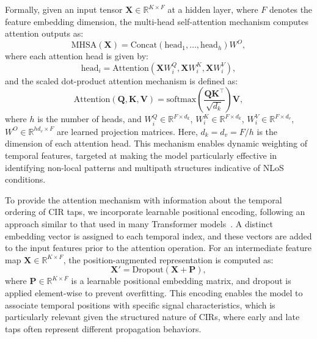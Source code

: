Formally, given an input tensor $\mathbf{X} \in \mathbb{R}^{K \times F}$ at a hidden layer, where $F$ denotes the feature embedding dimension, the multi-head self-attention mechanism computes attention outputs as:
\begin{equation}
    \text{MHSA}(\mathbf{X}) = \text{Concat}(\text{head}_1, \dots, \text{head}_h) W^O,
\end{equation}
where each attention head is given by:
\begin{equation}
    \text{head}_i = \text{Attention}(\mathbf{X} W_i^Q, \mathbf{X} W_i^K, \mathbf{X} W_i^V),
\end{equation}
and the scaled dot-product attention mechanism is defined as:
\begin{equation}
    \text{Attention}(\mathbf{Q}, \mathbf{K}, \mathbf{V}) = \text{softmax}\left( \frac{\mathbf{Q} \mathbf{K}^\top}{\sqrt{d_k}} \right) \mathbf{V},
\end{equation}
where $h$ is the number of heads, and $W_i^Q \in \mathbb{R}^{F \times d_k}$, $W_i^K \in \mathbb{R}^{F \times d_k}$, $W_i^V \in \mathbb{R}^{F \times d_v}$, $W^O \in \mathbb{R}^{hd_v \times F}$ are learned projection matrices. Here, $d_k = d_v = F/h$ is the dimension of each attention head. This mechanism enables dynamic weighting of temporal features, targeted at making the model particularly effective in identifying non-local patterns and multipath structures indicative of NLoS conditions.

To provide the attention mechanism with information about the temporal ordering of CIR taps, we incorporate learnable positional encoding, following an approach similar to that used in many Transformer models~\cite{2019-bert, 2022-simple-yet}. A distinct embedding vector is assigned to each temporal index, and these vectors are added to the input features prior to the attention operation. For an intermediate feature map $\mathbf{X} \in \mathbb{R}^{K \times F}$, the position-augmented representation is computed as:
\begin{equation}
    \mathbf{X}' = \text{Dropout}(\mathbf{X} + \mathbf{P}),
\end{equation}
where $\mathbf{P} \in \mathbb{R}^{K \times F}$ is a learnable positional embedding matrix, and dropout is applied element-wise to prevent overfitting. This encoding enables the model to associate temporal positions with specific signal characteristics, which is particularly relevant given the structured nature of CIRs, where early and late taps often represent different propagation behaviors.

